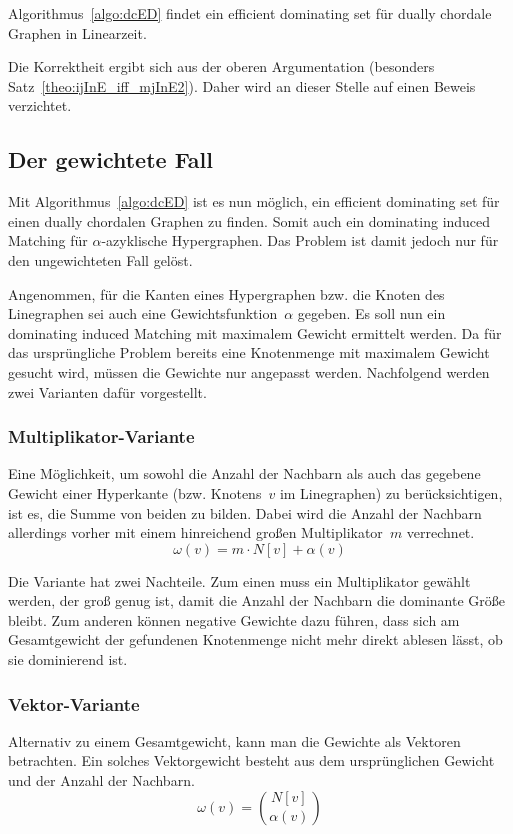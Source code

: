 \begin{Theorem}\label{theo:dcED}
    Algorithmus~\ref{algo:dcED} findet ein efficient dominating set für dually chordale Graphen in Linearzeit.
\end{Theorem}

Die Korrektheit ergibt sich aus der oberen Argumentation (besonders Satz~\ref{theo:ijInE_iff_mjInE2}). Daher wird an dieser Stelle auf einen Beweis verzichtet.

\subsection{Der gewichtete Fall}
Mit Algorithmus~\ref{algo:dcED} ist es nun möglich, ein efficient dominating set für einen dually chordalen Graphen zu finden. Somit auch ein dominating induced Matching für $\alpha$-azyklische Hypergraphen. Das Problem ist damit jedoch nur für den ungewichteten Fall gelöst.

Angenommen, für die Kanten eines Hypergraphen bzw. die Knoten des Linegraphen sei auch eine Gewichtsfunktion~$\alpha$ gegeben. Es soll nun ein dominating induced Matching mit maximalem Gewicht ermittelt werden. Da für das ursprüngliche Problem bereits eine Knotenmenge mit maximalem Gewicht gesucht wird, müssen die Gewichte nur angepasst werden. Nachfolgend werden zwei Varianten dafür vorgestellt.

\subsubsection{Multiplikator-Variante}
Eine Möglichkeit, um sowohl die Anzahl der Nachbarn als auch das gegebene Gewicht einer Hyperkante (bzw. Knotens~$v$ im Linegraphen) zu berücksichtigen, ist es, die Summe von beiden zu bilden. Dabei wird die Anzahl der Nachbarn allerdings vorher mit einem hinreichend großen Multiplikator~$m$ verrechnet.
\[ \omega(v) = m \cdot N[v] + \alpha(v) \]

Die Variante hat zwei Nachteile. Zum einen muss ein Multiplikator gewählt werden, der groß genug ist, damit die Anzahl der Nachbarn die dominante Größe bleibt. Zum anderen können negative Gewichte dazu führen, dass sich am Gesamtgewicht der gefundenen Knotenmenge  nicht mehr direkt ablesen lässt, ob sie dominierend ist.

\subsubsection{Vektor-Variante}
Alternativ zu einem Gesamtgewicht, kann man die Gewichte als Vektoren betrachten. Ein solches Vektorgewicht besteht aus dem ursprünglichen Gewicht und der Anzahl der Nachbarn. 
\[ \omega(v) =\binom{N[v]}{\alpha(v)} \]

